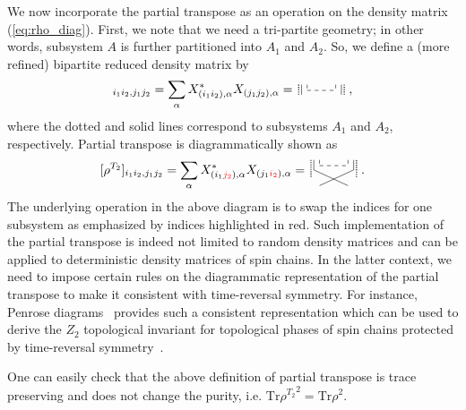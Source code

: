 \documentclass[aps,pra,groupedaddress,twocolumn,notitlepage,superscriptaddress,10pt]{revtex4-1}
\newcommand{\rT}{{\rho^{T_2}} }
\newcommand{\Tr}{\text{Tr}}
\begin{document}
We now incorporate the partial transpose as an operation on the density matrix (\ref{eq:rho_diag}).
First, we note that we need a tri-partite geometry; in other words, subsystem $A$ is further partitioned into $A_1$ and $A_2$. So, we define a (more refined) bipartite reduced density matrix by
\begin{align}
    [\rho]_{i_1i_2,j_1j_2}= \sum_\alpha X^\ast_{(i_1i_2),\alpha}X_{(j_1j_2),\alpha}
    =
    \,
    \tikz[scale=0.8,baseline=-0.5ex]{
    \draw[dashed] (0,0.2)-- (0,0);
    \draw[dashed] (0,0) -- (1,0);
    \draw[dashed]  (1,0.2) -- (1,0);
    \draw (-0.2,0.2)-- (-0.2,-0.15);
    \draw (1.2,-0.15)-- (1.2,0.2);
    \draw[densely dotted,thick] (-0.3,0.2)-- (-0.3,-0.15);
    \draw[densely dotted,thick] (1.3,-0.15)-- (1.3,0.2);
    }\ ,
\end{align}
where the dotted and solid lines correspond to subsystems $A_1$ and $A_2$, respectively. 
Partial transpose is diagrammatically shown as
\begin{align}
	\label{eq:rT_diag}
    [\rho^{T_2}]_{i_1i_2,j_1j_2}= \sum_\alpha X^\ast_{(i_1\textcolor{red}{j_2}),\alpha}X_{(j_1\textcolor{red}{i_2}),\alpha}
    =\,
    \tikz[scale=0.8,baseline=-1.5ex]{
    \draw[dashed] (0,0.2)-- (0,0);
    \draw[dashed] (0,0) -- (1,0);
    \draw[dashed]  (1,0.2) -- (1,0);
    \draw (-0.2,0.2)-- (-0.2,-0.15);
    \draw (-0.2,-0.15)-- (1.,-0.7);
    \draw (1.2,-0.15)-- (1.2,0.2);
    \draw (1.2,-0.15)-- (0,-0.7);
    \draw[densely dotted,thick] (-0.3,0.2)-- (-0.3,-0.4);
    \draw[densely dotted,thick] (1.3,-0.4)-- (1.3,0.2);
    }\ .
\end{align}
The underlying operation in the above diagram is to swap the indices for one subsystem as emphasized by indices highlighted in red. Such implementation of the partial transpose is indeed not limited to random density matrices and can be applied to deterministic density matrices of spin chains. In the latter context, we need to impose certain rules on the diagrammatic representation of the partial transpose to make it consistent with time-reversal symmetry. For instance, Penrose diagrams~\cite{1996PhRvD..54.2664D,Rovelli:2004tv}
provides such a consistent representation which can be used  to derive the $Z_2$ topological invariant for topological phases of spin chains protected by time-reversal symmetry~\cite{SMR20}.

One can easily check that the above definition of partial transpose is trace preserving and does not change the purity, i.e. $\Tr\rT^2=\Tr\rho^2$.
\end{document}
